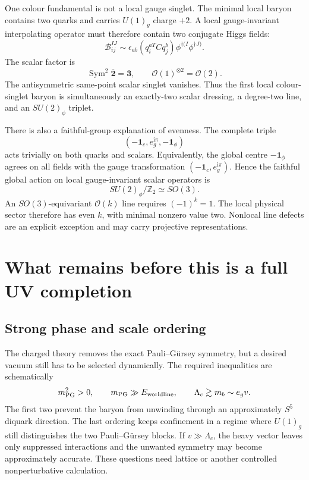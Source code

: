 \documentclass[11pt]{article}
\theoremstyle{definition}
\theoremstyle{remark}
\newcommand{\ii}{\mathrm i}
\newcommand{\ZZ}{\mathbb Z}
\newcommand{\cO}{\mathcal O}
\newcommand{\Sym}{\operatorname{Sym}}
\begin{document}
One colour fundamental is not a local gauge singlet.  The minimal local
baryon contains two quarks and carries \(U(1)_g\) charge \(+2\).  A local
gauge-invariant interpolating operator must therefore contain two conjugate
Higgs fields:
\begin{equation}
 \mathcal B^{IJ}_{ij}\sim
 \epsilon_{ab}(q_i^{aT}Cq_j^b)
 \phi^{\dagger (I}\phi^{\dagger J)}.
 \label{eq:dressed-baryon}
\end{equation}
The scalar factor is
\begin{equation}
 \Sym^2\overline{\bm2}=\bm3,
 \qquad
 \cO(1)^{\otimes2}=\cO(2).
 \label{eq:dressing-triplet}
\end{equation}
The antisymmetric same-point scalar singlet vanishes.  Thus the first local
colour-singlet baryon is simultaneously an exactly-two scalar dressing, a
degree-two line, and an \(SU(2)_\phi\) triplet.

There is also a faithful-group explanation of evenness.  The complete triple
\[
 (-\bm1_c,e^{\ii\pi}_g,-\bm1_\phi)
\]
acts trivially on both quarks and scalars.  Equivalently, the global centre
\(-\bm1_\phi\) agrees on all fields with the gauge transformation
\((-\bm1_c,e^{\ii\pi}_g)\).  Hence the faithful global action on local
gauge-invariant scalar operators is
\begin{equation}
 SU(2)_\phi/\ZZ_2\simeq SO(3).
 \label{eq:faithful-so3}
\end{equation}
An \(SO(3)\)-equivariant \(\cO(k)\) line requires \((-1)^k=1\).  The local
physical sector therefore has even \(k\), with minimal nonzero value two.
Nonlocal line defects are an explicit exception and may carry projective
representations.

\section{What remains before this is a full UV completion}

\subsection{Strong phase and scale ordering}

The charged theory removes the exact Pauli--G\"ursey symmetry, but a desired
vacuum still has to be selected dynamically.  The required inequalities are
schematically
\begin{equation}
 m_{\rm PG}^2>0,\qquad
 m_{\rm PG}\gg E_{\rm worldline},\qquad
 \Lambda_c\gtrsim m_b\sim e_gv.
 \label{eq:phase-gates}
\end{equation}
The first two prevent the baryon from unwinding through an approximately
\(S^5\) diquark direction.  The last ordering keeps confinement in a regime
where \(U(1)_g\) still distinguishes the two Pauli--G\"ursey blocks.  If
\(v\gg\Lambda_c\), the heavy vector leaves only suppressed interactions and
the unwanted symmetry may become approximately accurate.  These questions
need lattice or another controlled nonperturbative calculation.
\end{document}
